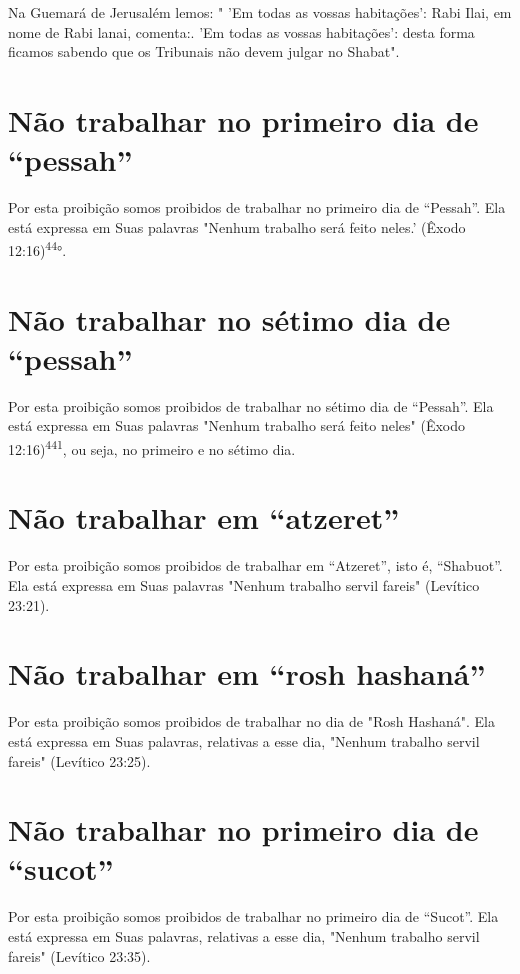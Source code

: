 Na Guemará de Jerusalém lemos: " 'Em todas as vossas habitações': Rabi
Ilai, em nome de Rabi lanai, comenta:. 'Em todas as vossas habitações':
desta forma ficamos sabendo que os Tribunais não devem julgar no
Shabat".

\section{Não trabalhar no primeiro dia de ``pessah''}

Por esta proibição somos proibidos de trabalhar no primeiro dia de
``Pessah''. Ela está expressa em Suas palavras "Nenhum trabalho será feito
ne­les.' (Êxodo 12:16)\textsuperscript{44}°.

\section{Não trabalhar no sétimo dia de ``pessah''}

Por esta proibição somos proibidos de trabalhar no sétimo dia de
``Pessah''. Ela está expressa em Suas palavras "Nenhum trabalho será feito
ne­les" (Êxodo 12:16)\textsuperscript{441}, ou seja, no primeiro e no
sétimo dia.

\section{Não trabalhar em ``atzeret''}

Por esta proibição somos proibidos de trabalhar em ``Atzeret'', isto é,
``Shabuot''. Ela está expressa em Suas palavras "Nenhum trabalho servil
fa­reis" (Levítico 23:21).

\section{Não trabalhar em ``rosh hashaná''}

Por esta proibição somos proibidos de trabalhar no dia de "Rosh
Has­haná". Ela está expressa em Suas palavras, relativas a esse dia,
"Nenhum traba­lho servil fareis" (Levítico 23:25).

\section{Não trabalhar no primeiro dia de ``sucot''}

Por esta proibição somos proibidos de trabalhar no primeiro dia de
``Sucot''. Ela está expressa em Suas palavras, relativas a esse dia,
"Nenhum tra­balho servil fareis" (Levítico 23:35).

